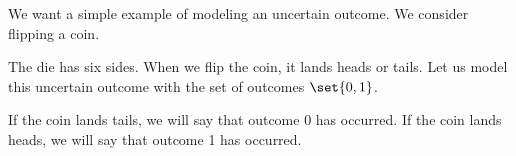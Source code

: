 
\sbasic









\sstart
{}


We want a simple example of
modeling an uncertain outcome.
We consider flipping a coin.


The die has six sides.
When we flip the coin,
it lands heads or tails.
Let us model this uncertain
outcome with the set of outcomes
$\set{0, 1}$.

If the coin lands tails, we will
say that outcome 0 has occurred.
If the coin lands heads, we will
say that outcome 1 has occurred.
\strats
